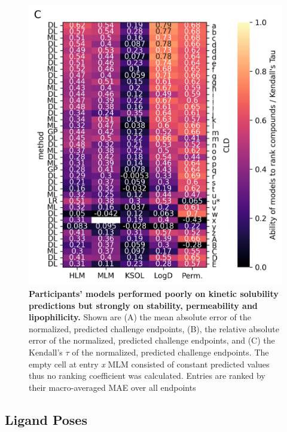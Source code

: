 \documentclass[journal=jcim,manuscript=article]{achemso}
\begin{document}
{\begin{figure}
    \includegraphics[scale=0.6]{fig5_admet_leaderboard/Figure_PanelC.png}
  \caption{\textbf{Participants' models performed poorly on kinetic solubility predictions but strongly on stability, permeability and lipophilicity.} Shown are (A) the mean absolute error of the normalized, predicted challenge endpoints, (B), the relative absolute error of the normalized, predicted challenge endpoints, and (C) the Kendall's $\tau$ of the normalized, predicted challenge endpoints. The empty cell at entry \textit{x} MLM consisted of constant predicted values thus no ranking coefficient was calculated. Entries are ranked by their macro-averaged MAE over all endpoints}
  \label{fgr:heatmaps_admet}
\end{figure}

\subsection{Ligand Poses}

}
\end{document}

